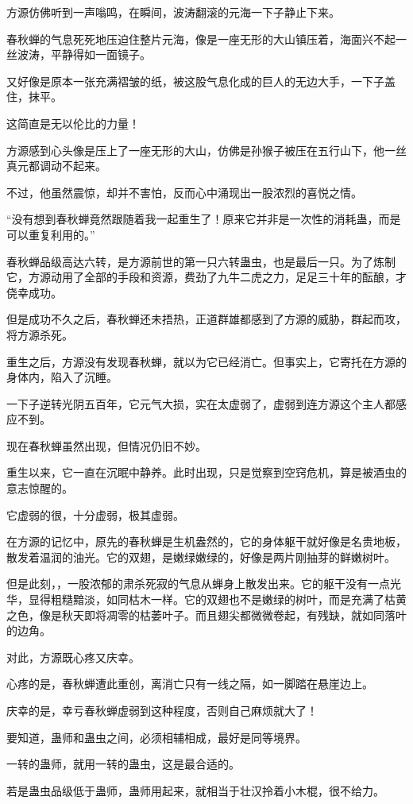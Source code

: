 \begin{this_body}
方源仿佛听到一声嗡鸣，在瞬间，波涛翻滚的元海一下子静止下来。

春秋蝉的气息死死地压迫住整片元海，像是一座无形的大山镇压着，海面兴不起一丝波涛，平静得如一面镜子。

又好像是原本一张充满褶皱的纸，被这股气息化成的巨人的无边大手，一下子盖住，抹平。

这简直是无以伦比的力量！

方源感到心头像是压上了一座无形的大山，仿佛是孙猴子被压在五行山下，他一丝真元都调动不起来。

不过，他虽然震惊，却并不害怕，反而心中涌现出一股浓烈的喜悦之情。

“没有想到春秋蝉竟然跟随着我一起重生了！原来它并非是一次性的消耗蛊，而是可以重复利用的。”

春秋蝉品级高达六转，是方源前世的第一只六转蛊虫，也是最后一只。为了炼制它，方源动用了全部的手段和资源，费劲了九牛二虎之力，足足三十年的酝酿，才侥幸成功。

但是成功不久之后，春秋蝉还未捂热，正道群雄都感到了方源的威胁，群起而攻，将方源杀死。

重生之后，方源没有发现春秋蝉，就以为它已经消亡。但事实上，它寄托在方源的身体内，陷入了沉睡。

一下子逆转光阴五百年，它元气大损，实在太虚弱了，虚弱到连方源这个主人都感应不到。

现在春秋蝉虽然出现，但情况仍旧不妙。

重生以来，它一直在沉眠中静养。此时出现，只是觉察到空窍危机，算是被酒虫的意志惊醒的。

它虚弱的很，十分虚弱，极其虚弱。

在方源的记忆中，原先的春秋蝉是生机盎然的，它的身体躯干就好像是名贵地板，散发着温润的油光。它的双翅，是嫩绿嫩绿的，好像是两片刚抽芽的鲜嫩树叶。

但是此刻，，一股浓郁的肃杀死寂的气息从蝉身上散发出来。它的躯干没有一点光华，显得粗糙黯淡，如同枯木一样。它的双翅也不是嫩绿的树叶，而是充满了枯黄之色，像是秋天即将凋零的枯萎叶子。而且翅尖都微微卷起，有残缺，就如同落叶的边角。

对此，方源既心疼又庆幸。

心疼的是，春秋蝉遭此重创，离消亡只有一线之隔，如一脚踏在悬崖边上。

庆幸的是，幸亏春秋蝉虚弱到这种程度，否则自己麻烦就大了！

要知道，蛊师和蛊虫之间，必须相辅相成，最好是同等境界。

一转的蛊师，就用一转的蛊虫，这是最合适的。

若是蛊虫品级低于蛊师，蛊师用起来，就相当于壮汉拎着小木棍，很不给力。


\end{this_body}
